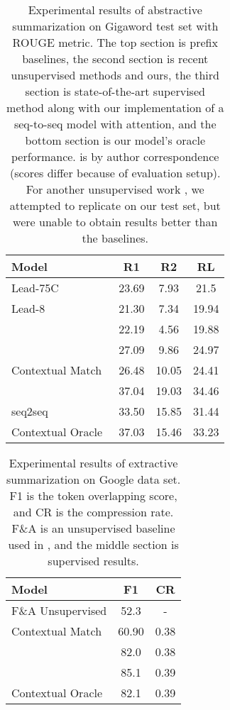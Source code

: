 \documentclass[11pt,a4paper]{article}
\newcommand{\ours}{Contextual Match}
\begin{document}
\begin{table}[t!]

\begin{center}
\begin{tabular}{lccc}  
\toprule
Model & R1 & R2 & RL \\ 
\midrule
Lead-75C & 23.69  & 7.93 & 21.5 \\
Lead-8 & 21.30 & 7.34 & 19.94 \\
\midrule
\citet{schumann2018unsupervised} & 22.19 & 4.56 & 19.88\\
\citet{wang2018learning} & 27.09 & 9.86 & 24.97 \\
\ours\ & 26.48 & 10.05 & 24.41 \\
\midrule
\citet{cao2018retrieve} & 37.04 & 19.03 & 34.46 \\
seq2seq & 33.50 & 15.85 & 31.44 \\
\midrule
Contextual Oracle & 37.03 & 15.46 & 33.23 \\
\bottomrule
\end{tabular}
\end{center}
\caption{Experimental results of abstractive summarization on Gigaword test set with ROUGE metric. The top section is prefix baselines, the second section is recent unsupervised methods and ours, the third section is state-of-the-art supervised method along with our implementation of a seq-to-seq model with attention, and the bottom section is our model's oracle performance. \citet{wang2018learning} is by author correspondence (scores differ because of evaluation setup). For another unsupervised work \citet{fevry2018unsupervised}, we attempted to replicate on our 
test set, but were unable to obtain results better than the baselines.}
\label{table:abstractive}
\end{table}









\begin{table}[t!]

\begin{center}
\begin{tabular}{lcc}
\toprule
Model & F1 & CR \\ 
\midrule
F\&A Unsupervised   & 52.3  &  - \\
\ours & 60.90  & 0.38\\
\midrule
\citet{filippova2015sentence} & 82.0 & 0.38\\
\citet{zhao2018language} & 85.1 & 0.39 \\
\midrule
Contextual Oracle & 82.1 & 0.39 \\
\bottomrule
\end{tabular}
\end{center}
\caption{Experimental results of extractive summarization on Google data set. F1 is the token overlapping score, and CR is the compression rate. F\&A is an unsupervised baseline used in \citet{filippova2013overcoming}, and the middle section is supervised results.}
\label{table:extractive}
\end{table}
\end{document}
